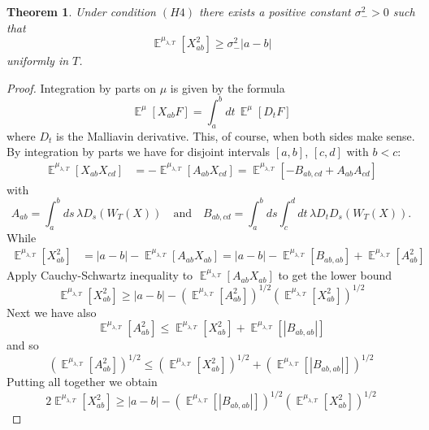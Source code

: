 \documentclass[a4paper,12pt,reqno]{amsart}
\newtheorem{theorem}{Theorem}
\DeclareMathOperator{\expect}{{\mathbb E}}
\begin{document}
\begin{theorem}
\label{th:lower}
Under condition $(H4)$
 there exists a positive constant $\sigma^2_->0$ such that
$$
\expect^{\mu_{\lambda,T}} [X_{ab}^2 ] \ge \sigma^2_- |a-b|
$$
uniformly in $T$.
\end{theorem}
\begin{proof}
Integration by parts on $\mu$ is given by the formula
\begin{equation*}
 \expect^{\mu} [X_{ab} F] = \int_{a}^b dt \, \expect^{\mu}[ D_t F ] 
\end{equation*}
where $D_t$ is the Malliavin derivative. This, of course, when both sides make sense.
By integration by parts  we have for
disjoint intervals $[a,b]$, $[c,d]$ with $b < c$:
\begin{equation}
  \begin{split}
\expect^{\mu_{\lambda,T}} [X_{ab} X_{cd}] & =  -
 \expect^{\mu_{\lambda,T}} [A_{ab} X_{cd}]      
=
\expect^{\mu_{\lambda,T}} [- B_{ab,cd} + A_{ab} A_{cd}]      
  \end{split}
\end{equation}
with
$$
A_{ab} = \int_{a}^{b}ds\, \lambda D_{s}(W_T(X))
\quad\text{and}\quad
B_{ab,cd} = \int_{a}^{b}ds \int_{c}^{d}dt\, \lambda D_t D_{s}(W_T(X)).
$$
While
\begin{equation}
  \begin{split}
\expect^{\mu_{\lambda,T}} [X_{ab}^2 ] & = |a-b|  -
 \expect^{\mu_{\lambda,T}} [A_{ab} X_{ab}]      
= |a-b| -  \expect^{\mu_{\lambda,T}} [ B_{ab,ab}] + \expect^{\mu_{\lambda,T}} [ A_{ab}^2]      
  \end{split}
\end{equation}
Apply Cauchy-Schwartz inequality to $\expect^{\mu_{\lambda,T}} [A_{ab} X_{ab}]  $ to get the lower bound
\begin{equation*}
  \expect^{\mu_{\lambda,T}} [X_{ab}^2 ] \ge 
|a-b|  -
 \left(\expect^{\mu_{\lambda,T}} [A_{ab}^2] \right)^{1/2}
\left(\expect^{\mu_{\lambda,T}}[ X_{ab}^2]\right)^{1/2}
\end{equation*}
Next we have also
\begin{equation*}
\expect^{\mu_{\lambda,T}} [ A_{ab}^2] \le \expect^{\mu_{\lambda,T}} [X_{ab}^2 ] +  \expect^{\mu_{\lambda,T}} [ |B_{ab,ab}|] 
\end{equation*}
and so
\begin{equation*}
\left(\expect^{\mu_{\lambda,T}} [ A_{ab}^2]\right)^{1/2} \le \left(\expect^{\mu_{\lambda,T}} [X_{ab}^2 ]\right)^{1/2} + \left( \expect^{\mu_{\lambda,T}} [ |B_{ab,ab}|]\right)^{1/2} 
\end{equation*}
Putting all together we obtain
\begin{equation*}
 2 \expect^{\mu_{\lambda,T}} [X_{ab}^2 ] \ge 
|a-b| - \left( \expect^{\mu_{\lambda,T}} [ |B_{ab,ab}|]\right)^{1/2} 
\left(\expect^{\mu_{\lambda,T}}[ X_{ab}^2]\right)^{1/2} 
\end{equation*}


\end{proof}
\end{document}
